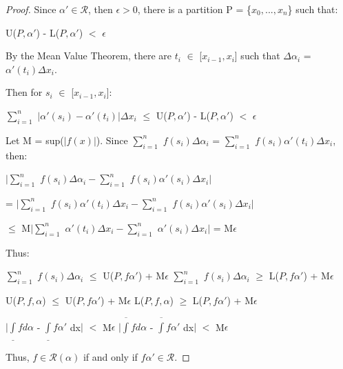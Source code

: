     \vspace{0.1cm}

    \begin{proof}
        Since $\alpha' \in \mathscr{R}$, then $\epsilon > 0$, there is a
        partition P = \{$x_0,...,x_n$\} such that:
        
        \hspace{0.5cm}
        U($P,\alpha'$) - L($P,\alpha'$) $<$ $\epsilon$

        By the Mean Value Theorem, there are $t_i$ $\in$ [$x_{i-1},x_i$]
        such that $\Delta \alpha_i$ = $\alpha'(t_i) \Delta x_i$.

        Then for $s_i$ $\in$ [$x_{i-1},x_i$]:

        \hspace{0.5cm}
        $\sum_{i=1}^n$ $|\alpha'(s_i) - \alpha'(t_i)| \Delta x_i$
        $\leq$ U($P,\alpha'$) - L($P,\alpha'$) $<$ $\epsilon$

        Let M = sup($|f(x)|$). Since
        $\sum_{i=1}^n$ $f(s_i) \Delta \alpha_i$
        = $\sum_{i=1}^n$ $f(s_i) \alpha'(t_i) \Delta x_i$, then:

        \hspace{0.5cm}
        $|\sum_{i=1}^n$ $f(s_i) \Delta \alpha_i
            - \sum_{i=1}^n$ $f(s_i) \alpha'(s_i) \Delta x_i|$

        \hspace{0.5cm}
        = $|\sum_{i=1}^n$ $f(s_i) \alpha'(t_i) \Delta x_i
            - \sum_{i=1}^n$ $f(s_i) \alpha'(s_i) \Delta x_i|$

        \hspace{0.5cm}
        $\leq$ M$|\sum_{i=1}^n$ $\alpha'(t_i) \Delta x_i
            - \sum_{i=1}^n$ $\alpha'(s_i) \Delta x_i|$
        = M$\epsilon$

        Thus:

        \hspace{0.5cm}
        $\sum_{i=1}^n$ $f(s_i) \Delta \alpha_i$
        $\leq$ U($P,f\alpha'$) + M$\epsilon$
        \hspace{1cm}
        $\sum_{i=1}^n$ $f(s_i) \Delta \alpha_i$
        $\geq$ L($P,f\alpha'$) + M$\epsilon$

        \hspace{0.5cm}
        U($P,f,\alpha$)
        $\leq$ U($P,f\alpha'$) + M$\epsilon$
        \hspace{1.9cm}
        L($P,f,\alpha$)
        $\geq$ L($P,f\alpha'$) + M$\epsilon$

        \hspace{0.5cm}
        $|$$\underline{\int} f d\alpha$ - $\underline{\int} f\alpha'$ dx$|$
        $<$ M$\epsilon$
        \hspace{2.9cm}
        $|$$\overline{\int} f d\alpha$ - $\overline{\int} f\alpha'$ dx$|$
        $<$ M$\epsilon$

        Thus, $f \in \mathscr{R}(\alpha)$ if and only if
        $f\alpha' \in \mathscr{R}$.
    \end{proof}

